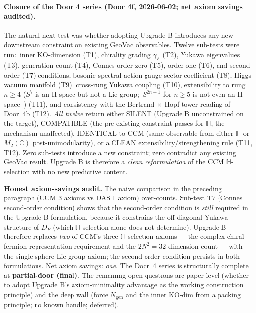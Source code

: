 \documentclass[11pt]{article}
\begin{document}
\paragraph{Closure of the Door 4 series (Door 4f, 2026-06-02; net axiom
savings audited).} The natural next test was whether adopting Upgrade B
introduces any new downstream constraint on existing GeoVac observables.
Twelve sub-tests were run:\ inner KO-dimension (T1), chirality grading
$\gamma_F$ (T2), Yukawa eigenvalues (T3), generation count (T4),
Connes order-zero (T5), order-one (T6), and second-order (T7)
conditions, bosonic spectral-action gauge-sector coefficient (T8),
Higgs vacuum manifold (T9), cross-rung Yukawa coupling (T10),
extensibility to rung $n \ge 4$ ($S^7$ is an H-space but not a Lie group;\ $S^{2n-1}$ for $n \ge 5$ is not even an H-space~\cite{adams1958}) (T11), and consistency
with the Bertrand $\times$ Hopf-tower reading of Door~4b (T12). \emph{All twelve} return either
SILENT (Upgrade B unconstrained on the target), COMPATIBLE (the
pre-existing constraint passes for $\mathbb{H}$, the mechanism
unaffected), IDENTICAL to CCM (same observable from either
$\mathbb{H}$ or $M_2(\mathbb{C})$ post-unimodularity), or a CLEAN
extensibility/strengthening rule (T11, T12). Zero sub-tests introduce
a new constraint; zero contradict any existing GeoVac result. Upgrade B
is therefore a \emph{clean reformulation} of the CCM $\mathbb{H}$-selection
with no new predictive content.

\textbf{Honest axiom-savings audit.} The naive comparison in the
preceding paragraph (CCM 3 axioms vs DAS 1 axiom) over-counts. Sub-test
T7 (Connes second-order condition) shows that the second-order
condition is \emph{still} required in the Upgrade-B formulation,
because it constrains the off-diagonal Yukawa structure of $D_F$
(which $\mathbb{H}$-selection alone does not determine).
Upgrade B therefore replaces \emph{two} of CCM's three
$\mathbb{H}$-selection axioms --- the complex chiral fermion
representation requirement and the $2N^2 = 32$ dimension count ---
with the single sphere-Lie-group axiom; the second-order condition
persists in both formulations. Net axiom savings: \emph{one}. The
Door~4 series is structurally complete at \textbf{partial-door (final)}.
The remaining open questions are paper-level (whether to adopt
Upgrade B's axiom-minimality advantage as the working construction
principle) and the deep wall (force $N_{\mathrm{gen}}$ and the inner
KO-dim from a packing principle; no known handle; deferred).
\end{document}
